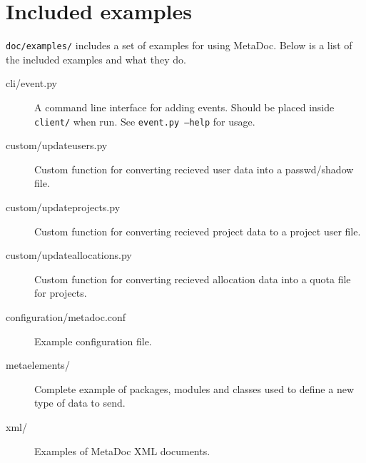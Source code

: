 \newpage
\section{Included examples}
\texttt{doc/examples/} includes a set of examples for using MetaDoc. Below is a
list of the included examples and what they do. 

\begin{description}
    \item[cli/event.py] A command line interface for adding events. Should be
    placed inside \texttt{client/} when run. See \texttt{event.py --help} for
    usage.
    \item[custom/updateusers.py]    Custom function for converting recieved
    user data into a passwd/shadow file.
    \item[custom/updateprojects.py] Custom function for converting recieved
    project data to a project user file.
    \item[custom/updateallocations.py]  Custom function for converting recieved
    allocation data into a quota file for projects.
    \item[configuration/metadoc.conf]   Example configuration file.
    \item[metaelements/]    Complete example of packages, modules and classes
    used to define a new type of data to send.
    \item[xml/] Examples of MetaDoc XML documents.
\end{description}
